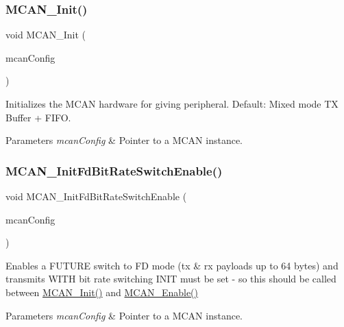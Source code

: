 \subsubsection{\texorpdfstring{MCAN\_Init()}{MCAN\_Init()}}
{\footnotesize\ttfamily void M\+C\+A\+N\+\_\+\+Init (\begin{DoxyParamCaption}\item[{const \mbox{\hyperlink{structMCan__ConfigTag}{M\+Can\+\_\+\+Config\+Type}} $\ast$}]{mcan\+Config }\end{DoxyParamCaption})}



Initializes the M\+C\+AN hardware for giving peripheral. Default\+: Mixed mode TX Buffer + F\+I\+FO. 


\begin{DoxyParams}{Parameters}
{\em mcan\+Config} & Pointer to a M\+C\+AN instance. \\
\hline
\end{DoxyParams}
\mbox{\label{group__can__module_ga70121d88d13dc887de45ec346a080efb}} 
\subsubsection{\texorpdfstring{MCAN\_InitFdBitRateSwitchEnable()}{MCAN\_InitFdBitRateSwitchEnable()}}
{\footnotesize\ttfamily void M\+C\+A\+N\+\_\+\+Init\+Fd\+Bit\+Rate\+Switch\+Enable (\begin{DoxyParamCaption}\item[{const \mbox{\hyperlink{structMCan__ConfigTag}{M\+Can\+\_\+\+Config\+Type}} $\ast$}]{mcan\+Config }\end{DoxyParamCaption})}



Enables a F\+U\+T\+U\+RE switch to FD mode (tx \& rx payloads up to 64 bytes) and transmits W\+I\+TH bit rate switching I\+N\+IT must be set -\/ so this should be called between \mbox{\hyperlink{group__can__module_ga9b35cd79fb5eeec8cf1ba7247b25a646}{M\+C\+A\+N\+\_\+\+Init()}} and \mbox{\hyperlink{group__can__module_ga712fa4d48e3fd1365a08a91cd3932104}{M\+C\+A\+N\+\_\+\+Enable()}} 


\begin{DoxyParams}{Parameters}
{\em mcan\+Config} & Pointer to a M\+C\+AN instance. \\
\hline
\end{DoxyParams}
\mbox{\label{group__can__module_gac443cf440414e78292b1db93763baaf2}} 
